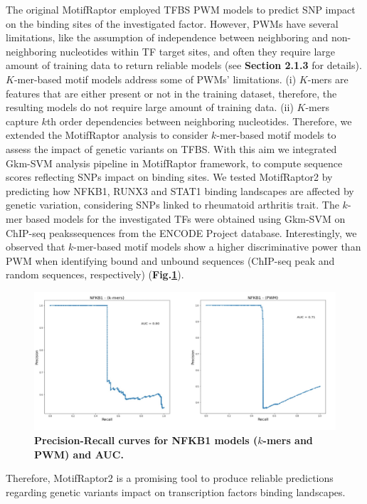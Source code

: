 \documentclass[a4paper, titlepage, openright]{book}
\begin{document}
The original MotifRaptor employed TFBS PWM models to predict SNP impact on the binding sites of the investigated factor. However, PWMs have several limitations, like the assumption of independence between neighboring and non-neighboring nucleotides within TF target sites, and often they require large amount of training data to return reliable models \citep{zhao2011quantitative} (see \textbf{Section 2.1.3} for details). $K$-mer-based motif models address some of PWMs' limitations. (i) $K$-mers are features that are either present or not in the training dataset, therefore, the resulting models do not require large amount of training data. (ii) $K$-mers capture $k$th order dependencies between neighboring nucleotides. Therefore, we extended the MotifRaptor analysis to consider $k$-mer-based motif models to assess the impact of genetic variants on TFBS. With this aim we integrated Gkm-SVM analysis pipeline in MotifRaptor framework, to compute sequence scores reflecting SNPs impact on binding sites. We tested MotifRaptor2 by predicting how NFKB1, RUNX3 and STAT1 binding landscapes are affected by genetic variation, considering SNPs linked to rheumatoid arthritis trait. The $k$-mer based models for the investigated TFs were obtained using Gkm-SVM on ChIP-seq peakssequences from the ENCODE Project database. Interestingly, we observed that $k$-mer-based motif models show a higher discriminative power than PWM when identifying bound and unbound sequences (ChIP-seq peak and random sequences, respectively) (\textbf{Fig.\ref{fig:motifraptor2}}).
\begin{figure}
	\centering
	\includegraphics[width=\textwidth]{figures/motifraptor2.jpg}
	\caption[Precision-Recall curves for NFKB1 models ($k$-mers and PWM) and AUC]{\textbf{Precision-Recall curves for NFKB1 models ($k$-mers and PWM) and AUC.}}
	\label{fig:motifraptor2}
\end{figure} 
Therefore, MotifRaptor2 is a promising tool to produce reliable predictions regarding genetic variants impact on transcription factors binding landscapes.
\end{document}
